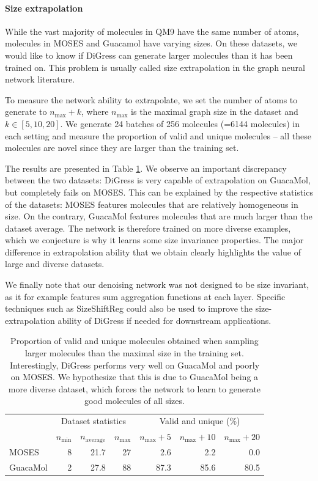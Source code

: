 \documentclass{article} %
\theoremstyle{plain}
\theoremstyle{definition}
\theoremstyle{remark}
\begin{document}
\paragraph{Size extrapolation}

While the vast majority of molecules in QM9 have the same number of atoms, molecules in MOSES and Guacamol have varying sizes. On these datasets, we would like to know if DiGress can generate larger molecules than it has been trained on. This problem is usually called size extrapolation in the graph neural network literature.

To measure the network ability to extrapolate, we set the number of atoms to generate to $n_\text{max} + k$, where $n_\text{max}$ is the maximal graph size in the dataset and $k \in [5, 10, 20]$. We generate 24 batches of 256 molecules (=6144 molecules) in each setting and measure the proportion of valid and unique molecules -- all these molecules are novel since they are larger than the training set.

The results are presented in Table \ref{tab:size-extrapolation}. We observe an important discrepancy between the two datasets: DiGress is very capable of extrapolation on GuacaMol, but completely fails on MOSES. This can be explained by the respective statistics of the datasets: MOSES features molecules that are relatively homogeneous in size. On the contrary, GuacaMol features molecules that are much larger than the dataset average. The network is therefore trained on more diverse examples, which we conjecture is why it learns some size invariance properties. The major difference in extrapolation ability that we obtain clearly highlights the value of large and diverse datasets.

We finally note that our denoising network was not designed to be size invariant, as it for example features sum aggregation functions at each layer. Specific techniques such as SizeShiftReg \citep{buffelli2022sizeshiftreg} could also be used to improve the size-extrapolation ability of DiGress if needed for downstream applications.

\begin{table}[t]
    \centering
    \caption{Proportion of valid and unique molecules obtained when sampling larger molecules than the maximal size in the training set. Interestingly, DiGress performs very well on GuacaMol and poorly on MOSES. We hypothesize that this is due to GuacaMol being a more diverse dataset, which forces the network to learn to generate good molecules of all sizes.}
        \label{tab:size-extrapolation}
    \begin{tabular}{l | r r r | r r r}
    \toprule
     & \multicolumn{3}{c|}{Dataset statistics} & \multicolumn{3}{c}{Valid and unique (\%)} \\
        & $n_\text{min}$ & $n_\text{average}$ & $n_\text{max}$ & $n_\text{max} + 5$ & $n_\text{max} + 10$ & $n_\text{max} + 20$ \\\midrule
    MOSES     & 8 & 21.7 & 27 & 2.6 & 2.2 & 0.0\\
    GuacaMol &  2 & 27.8 & 88 & 87.3 & 85.6 & 80.5 \\\bottomrule
    \end{tabular}
\end{table}
\end{document}
